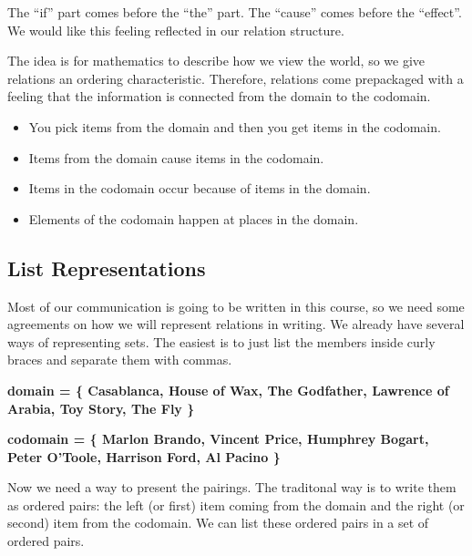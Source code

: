 \documentclass{ximera}
\begin{document}
The ``if'' part comes before the ``the'' part.  The ``cause'' comes before the ``effect''.  We would like this feeling reflected in our relation structure.  


The idea is for mathematics to describe how we view the world, so we give relations an ordering characteristic. Therefore, relations come prepackaged with a feeling that the information is connected from the domain to the codomain.






\begin{itemize}
\item You pick items from the domain and then you get items in the codomain.
\item Items from the domain cause items in the codomain.
\item Items in the codomain occur because of items in the domain.
\item Elements of the codomain happen at places in the domain.
\end{itemize}










\subsection{List Representations}

Most of our communication is going to be written in this course, so we need some agreements on how we will represent relations in writing.  We already have several ways of representing sets.  The easiest is to just list the members inside curly braces and separate them with commas.

\begin{center} 
\textbf{\textcolor{blue!75!black}{ domain = \{ Casablanca, House of Wax,  The Godfather, Lawrence of Arabia, Toy Story, The Fly \} }}
\end{center}

\begin{center} 
\textbf{\textcolor{blue!75!black}{ codomain = \{ Marlon Brando, Vincent Price, Humphrey Bogart, Peter O'Toole, Harrison Ford, Al Pacino \} }}
\end{center}

Now we need a way to present the pairings.  The traditonal way is to write them as ordered pairs: the left (or first) item coming from the domain and the right (or second) item from the codomain.  We can list these ordered pairs in a set of ordered pairs. 
\end{document}
